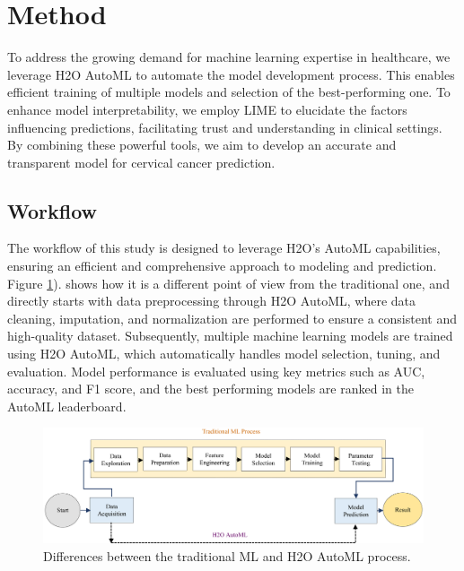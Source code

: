 \documentclass{llncs}
\begin{document}

\section{Method}


To address the growing demand for machine learning expertise in healthcare, we leverage H2O AutoML to automate the model development process. This enables efficient training of multiple models and selection of the best-performing one. To enhance model interpretability, we employ LIME to elucidate the factors influencing predictions, facilitating trust and understanding in clinical settings. By combining these powerful tools, we aim to develop an accurate and transparent model for cervical cancer prediction.

\subsection{Workflow}

The workflow of this study is designed to leverage H2O’s AutoML capabilities, ensuring an efficient and comprehensive approach to modeling and prediction. Figure \ref{fig:dataset}). shows how it is a different point of view from the traditional one, and directly starts with data preprocessing through H2O AutoML, where data cleaning, imputation, and normalization are performed to ensure a consistent and high-quality dataset. Subsequently, multiple machine learning models are trained using H2O AutoML, which automatically handles model selection, tuning, and evaluation. Model performance is evaluated using key metrics such as AUC, accuracy, and F1 score, and the best performing models are ranked in the AutoML leaderboard.



\begin{figure}[h!]
	\begin{center}  %
		\includegraphics[width=1\textwidth]{images/workflow.png}
		\caption{Differences between the traditional ML and H2O AutoML process.}
		\label{fig:dataset}
	\end{center}
\end{figure}
\end{document}

